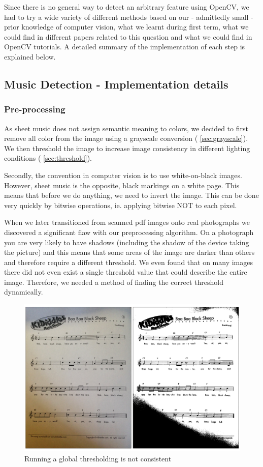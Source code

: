 Since there is no general way to detect an arbitrary feature using OpenCV, we had to try a wide variety of different methods based on our - admittedly small - prior knowledge of computer vision, what we learnt during first term, what we could find in different papers related to this question and what we could find in OpenCV tutorials. A detailed summary of the implementation of each step is explained below.

\subsection{Music Detection - Implementation details}

\subsubsection{Pre-processing}

As sheet music does not assign semantic meaning to colors, we decided to first remove all color from the image using a grayscale conversion ( \autoref{sec:grayscale}). We then threshold the image to increase image consistency in different lighting conditions ( \autoref{sec:threshold}). 

Secondly, the convention in computer vision is to use white-on-black images. However, sheet music is the opposite, black markings on a white page. This means that before we do anything, we need to invert the image. This can be done very quickly by bitwise operations, ie. applying bitwise NOT to each pixel.

When we later transitioned from scanned pdf images onto real photographs we discovered a significant flaw with our preprocessing algorithm. On a photograph you are very likely to have shadows (including the shadow of the device taking the picture) and this means that some areas of the image are darker than others and therefore require a different threshold. We even found that on many images there did not even exist a single threshold value that could describe the entire
image. Therefore, we needed a method of finding the correct threshold dynamically.

\begin{figure}[h!]
    \centering
    \includegraphics[width=120mm]{./assets/thresholding.png}
    \caption{Running a global thresholding is not consistent}
    \label{image:thresholding}
\end{figure}

